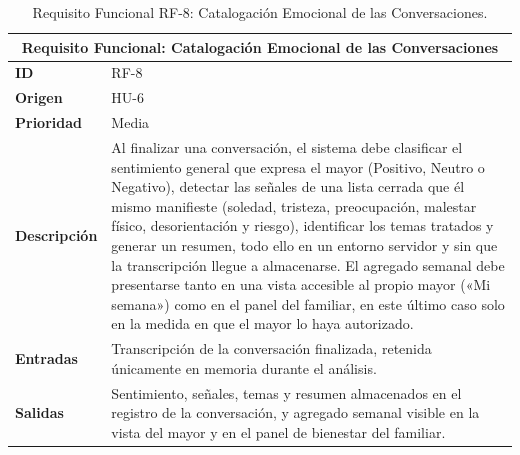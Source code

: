 \begin{table}[htbp]
    \centering
    \renewcommand{\arraystretch}{1.3}
    \begin{tabular}{|l|>{\raggedright\arraybackslash}p{}|}
        \hline
        \multicolumn{2}{|c|}{\textbf{Requisito Funcional: Catalogación Emocional de las Conversaciones}} \\
        \hline
        \textbf{ID} & RF-8 \\
        \hline
        \textbf{Origen} & HU-6 \\
        \hline
        \textbf{Prioridad} & Media \\
        \hline
        \textbf{Descripción} & Al finalizar una conversación, el sistema debe clasificar el sentimiento
            general que expresa el mayor (Positivo, Neutro o Negativo), detectar las señales de una lista
            cerrada que él mismo manifieste (soledad, tristeza, preocupación, malestar físico, desorientación
            y riesgo), identificar los temas tratados y generar un resumen, todo ello en un entorno servidor
            y sin que la transcripción llegue a almacenarse. El agregado semanal debe presentarse tanto en
            una vista accesible al propio mayor («Mi semana») como en el panel del familiar, en este último
            caso solo en la medida en que el mayor lo haya autorizado. \\
        \hline
        \textbf{Entradas} & Transcripción de la conversación finalizada, retenida únicamente en memoria
            durante el análisis. \\
        \hline
        \textbf{Salidas} & Sentimiento, señales, temas y resumen almacenados en el registro de la
            conversación, y agregado semanal visible en la vista del mayor y en el panel de bienestar del
            familiar. \\
        \hline
    \end{tabular}
    \caption{Requisito Funcional RF-8: Catalogación Emocional de las Conversaciones.}
    \label{tab:rf8}
\end{table}

